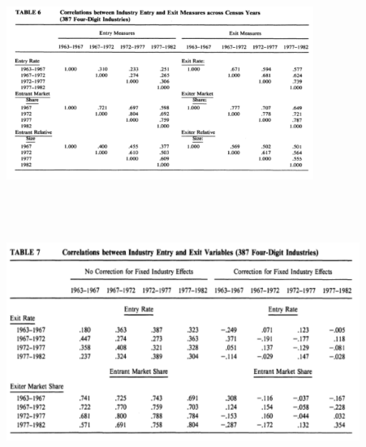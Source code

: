 \documentclass[dvipdfmx,12pt]{beamer}
\begin{document}
\begin{frame}

\begin{center}

\includegraphics[width=10cm,height=7.75cm]{DRS_T6.pdf}

\end{center}

\end{frame}

\begin{frame}

\begin{center}

\includegraphics[width=11.5cm,height=7.5cm]{DRS_T7.pdf}

\end{center}

\end{frame}
\end{document}
